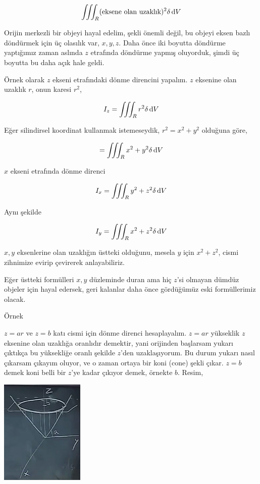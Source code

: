 \documentclass[12pt,fleqn]{article}\usepackage{../../common}
\begin{document}
$$ 
\iiint_R (\textrm{eksene olan uzaklık})^2 \delta \,\mathrm{d} V
$$

Orijin merkezli bir objeyi hayal edelim, şekli önemli değil, bu objeyi
eksen bazlı döndürmek için üç olasılık var, $x,y,z$. Daha önce iki boyutta
döndürme yaptığımız zaman aslında $z$ etrafında döndürme yapmış oluyorduk,
şimdi üç boyutta bu daha açık hale geldi. 

Örnek olarak $z$ ekseni etrafındaki dönme direncini yapalım. $z$ eksenine
olan uzaklık $r$, onun karesi $r^2$, 

$$ 
I_z = \iiint_R r^2 \delta \,\mathrm{d} V
$$

Eğer silindirsel koordinat kullanmak istemeseydik, $r^2 = x^2 + y^2$ olduğuna
göre, 

$$ 
 = \iiint_R x^2 + y^2 \delta \,\mathrm{d} V
$$

$x$ ekseni etrafında dönme direnci

$$ 
I_x = \iiint_R y^2 + z^2 \delta \,\mathrm{d} V
$$

Aynı şekilde

$$ 
I_y = \iiint_R x^2 + z^2 \delta \,\mathrm{d} V
$$

$x,y$ eksenlerine olan uzaklığın üstteki olduğunu, mesela $y$ için
$x^2+z^2$, cismi zihnimize evirip çevirerek anlayabiliriz.

Eğer üstteki formülleri $x,y$ düzleminde duran ama hiç $z$'si olmayan
dümdüz objeler için hayal edersek, geri kalanlar daha önce gördüğümüz eski
formüllerimiz olacak.

Örnek

$z=ar$ ve $z=b$ katı cismi için dönme direnci hesaplayalım. $z=ar$
yükseklik $z$ eksenine olan uzaklığa oranlıdır demektir, yani orijinden
başlarsam yukarı çıktıkça bu yüksekliğe oranlı şekilde $z$'den
uzaklaşıyorum. Bu durum yukarı nasıl çıkarsam çıkayım oluyor, ve o zaman
ortaya bir koni (cone) şekli çıkar. $z=b$ demek koni belli bir $z$'ye kadar
çıkıyor demek, örnekte $b$. Resim,

\begin{center}
\includegraphics[height=5cm]{25_11.png}
\end{center}
\end{document}

